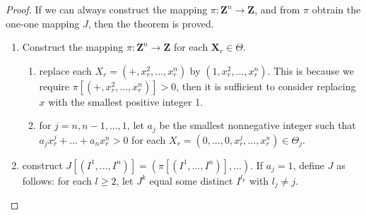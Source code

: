 \begin{proof}
If we can always construct the mapping $\pi:\mathbf{Z}^n \rightarrow \mathbf{Z}$,
and from $\pi$ obtrain the one-one mapping $J$, then the theorem is proved.

\begin{enumerate}
\item Construct the mapping $\pi: \mathbf{Z}^n \rightarrow \mathbf{Z}$ for each
$\mathbf{X}_r \in \Theta$.

  \begin{enumerate}

  \item replace each $X_r = (+,x_r^2,...,x_r^n)$ by $(1,x_r^2,...,x_r^n)$. This is
  because we require $\pi[(+, x_r^2,...,x_r^n)] > 0$, then it is sufficient to consider
  replacing $x$ with the smallest positive integer 1.
  \item for $j=n,n-1,...,1$, let $a_j$ be the smallest nonnegative integer such
  that $a_j x_r^j + ... + a_n x_r^n > 0$ for each $X_r = (0,...,0,x_r^j,...,x_r^n) \in \Theta_j$.

  \end{enumerate}

\item construct $J[(I^1,...,I^n)] = (\pi[(I^1,...,I^n)],...)$. If $a_j = 1$,
define $J$ as follows: for each $l \ge 2$, let $J^k$ equal some distinct $I^{l_k}$
with $l_j \ne j$.

\end{enumerate}
\end{proof}
